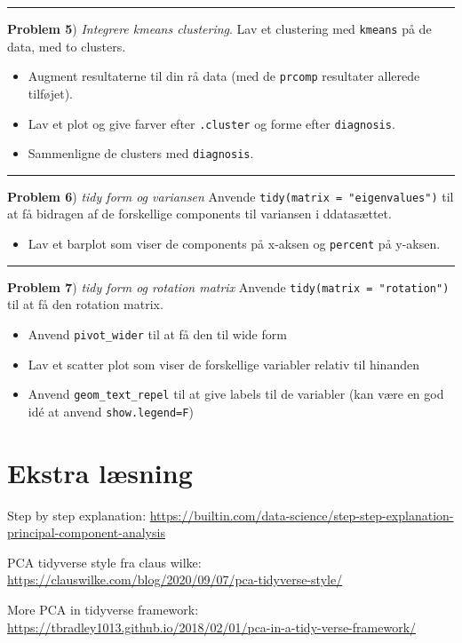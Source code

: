 \documentclass[
]{book}
\providecommand{\tightlist}{%
  \setlength{\itemsep}{0pt}\setlength{\parskip}{0pt}}
\begin{document}
\begin{center}\rule{0.5\linewidth}{0.5pt}\end{center}

\textbf{Problem 5}) \emph{Integrere kmeans clustering}. Lav et clustering med \texttt{kmeans} på de data, med to clusters.

\begin{itemize}
\tightlist
\item
  Augment resultaterne til din rå data (med de \texttt{prcomp} resultater allerede tilføjet).
\item
  Lav et plot og give farver efter \texttt{.cluster} og forme efter \texttt{diagnosis}.
\item
  Sammenligne de clusters med \texttt{diagnosis}.
\end{itemize}

\begin{center}\rule{0.5\linewidth}{0.5pt}\end{center}

\textbf{Problem 6}) \emph{tidy form og variansen} Anvende \texttt{tidy(matrix\ =\ "eigenvalues")} til at få bidragen af de forskellige components til variansen i ddatasættet.

\begin{itemize}
\tightlist
\item
  Lav et barplot som viser de components på x-aksen og \texttt{percent} på y-aksen.
\end{itemize}

\begin{center}\rule{0.5\linewidth}{0.5pt}\end{center}

\textbf{Problem 7}) \emph{tidy form og rotation matrix} Anvende \texttt{tidy(matrix\ =\ "rotation")} til at få den rotation matrix.

\begin{itemize}
\tightlist
\item
  Anvend \texttt{pivot\_wider} til at få den til wide form
\item
  Lav et scatter plot som viser de forskellige variabler relativ til hinanden
\item
  Anvend \texttt{geom\_text\_repel} til at give labels til de variabler (kan være en god idé at anvend \texttt{show.legend=F})
\end{itemize}

\hypertarget{ekstra-luxe6sning}{%
\section{Ekstra læsning}\label{ekstra-luxe6sning}}

Step by step explanation: \url{https://builtin.com/data-science/step-step-explanation-principal-component-analysis}

PCA tidyverse style fra claus wilke: \url{https://clauswilke.com/blog/2020/09/07/pca-tidyverse-style/}

More PCA in tidyverse framework: \url{https://tbradley1013.github.io/2018/02/01/pca-in-a-tidy-verse-framework/}

  
\end{document}
